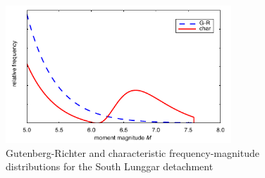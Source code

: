 \documentclass[draft,grl]{AGUTeX}
\begin{document}
\begin{figure}[b]
\noindent\includegraphics[width=20pc]{./figures/F-Ms.pdf}
\caption{Gutenberg-Richter and characteristic frequency-magnitude 
                  distributions for the South Lunggar detachment}
\label{fig:fms}
\end{figure}
\end{document}

